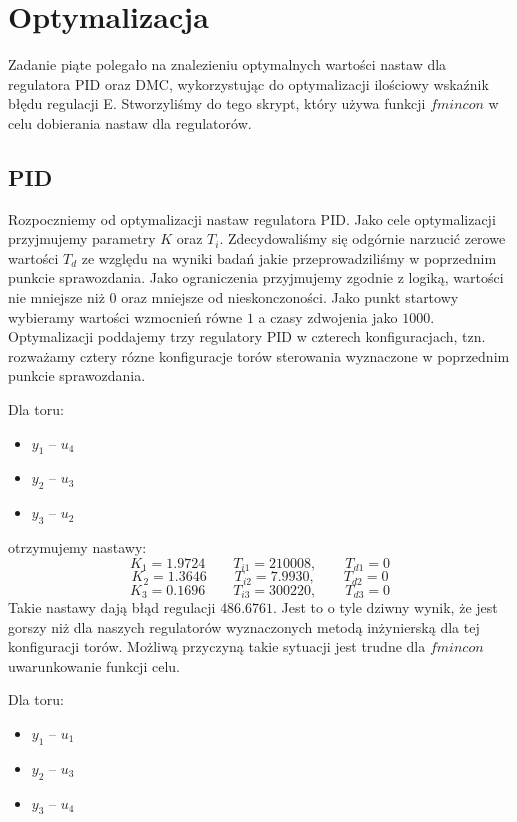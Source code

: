 \chapter{Optymalizacja}
Zadanie piąte polegało na znalezieniu optymalnych wartości nastaw dla regulatora PID oraz DMC, wykorzystując do optymalizacji ilościowy wskaźnik błędu regulacji E.
Stworzyliśmy do tego skrypt, który używa funkcji $fmincon$ w celu dobierania nastaw dla regulatorów. 

\section{PID}
Rozpoczniemy od optymalizacji nastaw regulatora PID. Jako cele optymalizacji przyjmujemy parametry $K$ oraz $T_i$. Zdecydowaliśmy się odgórnie narzucić zerowe wartości
$T_d$ ze względu na wyniki badań jakie przeprowadziliśmy w poprzednim punkcie sprawozdania. 
Jako ograniczenia przyjmujemy zgodnie z logiką, wartości nie mniejsze niż 0 oraz mniejsze od nieskonczoności.
Jako punkt startowy wybieramy wartości wzmocnień równe $1$ a  czasy zdwojenia jako $1000$. 
Optymalizacji poddajemy trzy regulatory PID w czterech konfiguracjach, tzn. 
rozważamy cztery rózne konfiguracje torów sterowania wyznaczone w poprzednim punkcie sprawozdania. 

Dla toru:
\begin{itemize}
  \item $y_1$ -- $u_4$
 \item $y_2$ -- $u_3$
 \item $y_3$ -- $u_2$
\end{itemize}

otrzymujemy nastawy:
\begin{equation}
  K_1 = \num{1.9724} \qquad T_{i1} = \num{210008}, \qquad T_{d1} = 0 \nonumber
\end{equation}
\begin{equation}
  K_2 = \num{1.3646} \qquad T_{i2} = \num{7.9930}, \qquad T_{d2} = 0
\end{equation}
\begin{equation}
  K_3 = \num{0.1696} \qquad T_{i3} = \num{300220}, \qquad T_{d3} = 0 \nonumber
\end{equation}
Takie nastawy dają błąd regulacji $\num{486,6761}$. Jest to o tyle dziwny wynik, że jest gorszy niż
dla naszych regulatorów wyznaczonych metodą inżynierską dla tej konfiguracji torów. Możliwą przyczyną
takie sytuacji jest trudne dla $fmincon$ uwarunkowanie funkcji celu. 


Dla toru:
\begin{itemize}
  \item $y_1$ -- $u_1$
 \item $y_2$ -- $u_3$
 \item $y_3$ -- $u_4$
\end{itemize}


